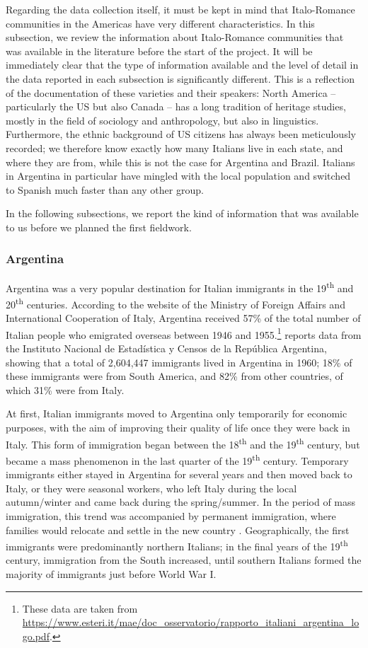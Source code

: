 \documentclass[output=paper,hidelinks]{langscibook}
\begin{document}
Regarding the data collection itself, it must be kept in mind that Italo-Romance communities in the Americas have very different characteristics. In this subsection, we review the information about Italo-Romance communities that was available in the literature before the start of the project. It will be immediately clear that the type of information available and the level of detail in the data reported in each subsection is significantly different. This is a reflection of the documentation of these varieties and their speakers: North America -- particularly the US but also Canada -- has a long tradition of heritage studies, mostly in the field of sociology and anthropology, but also in linguistics. Furthermore, the ethnic background of US citizens has always been meticulously recorded; we therefore know exactly how many Italians live in each state, and where they are from, while this is not the case for Argentina and Brazil. Italians in Argentina in particular have mingled with the local population and switched to Spanish much faster than any other group. 

In the following subsections, we report the kind of information that was available to us before we planned the first fieldwork.

\subsubsection{Argentina}\label{sec:andrani:2.1.1}

Argentina was a very popular destination for Italian immigrants in the 19\textsuperscript{th} and 20\textsuperscript{th} centuries. According to the website of the Ministry of Foreign Affairs and International Cooperation of Italy, Argentina received 57\% of the total number of Italian people who emigrated overseas between 1946 and 1955.\footnote{These data are taken from \url{https://www.esteri.it/mae/doc\_osservatorio/rapporto\_italiani\_argentina\_logo.pdf}.} \citet{Maurizio2008} reports data from the Instituto Nacional de Estadística y Censos de la República Argentina, showing that a total of 2,604,447 immigrants lived in Argentina in 1960; 18\% of these immigrants were from South America, and 82\% from other countries, of which 31\% were from Italy.

At first, Italian immigrants moved to Argentina only temporarily for economic purposes, with the aim of improving their quality of life once they were back in Italy. This form of immigration began between the 18\textsuperscript{th} and the 19\textsuperscript{th} century, but became a mass phenomenon in the last quarter of the 19\textsuperscript{th} century. Temporary immigrants either stayed in Argentina for several years and then moved back to Italy, or they were seasonal workers, who left Italy during the local autumn/winter and came back during the spring/summer. In the period of mass immigration, this trend was accompanied by permanent immigration, where families would relocate and settle in the new country \citep{Ferrari2008}. Geographically, the first immigrants were predominantly northern Italians; in the final years of the 19\textsuperscript{th} century, immigration from the South increased, until southern Italians formed the majority of immigrants just before World War I.
\end{document}
